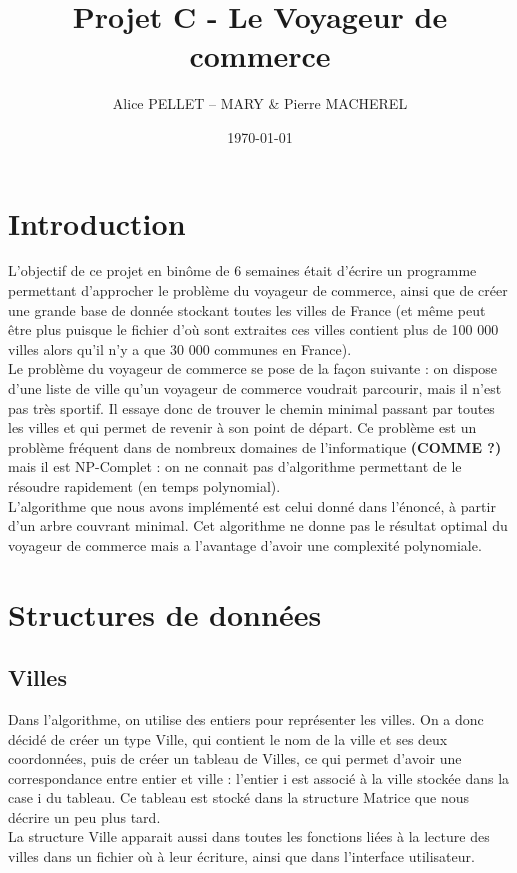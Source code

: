\documentclass[a4paper,11pt]{article}
\date{\today}
\title{Projet C - Le Voyageur de commerce}
\author{Alice PELLET -- MARY \& Pierre MACHEREL}
\begin{document}
\maketitle
\tableofcontents

\section*{Introduction} %

L'objectif de ce projet en binôme de 6 semaines était d'écrire un programme permettant d'approcher le problème du voyageur de commerce, ainsi que de créer une grande base de donnée stockant toutes les villes de France (et même peut être plus puisque le fichier d'où sont extraites ces villes contient plus de 100 000 villes alors qu'il n'y a que 30 000 communes en France).\\
Le problème du voyageur de commerce se pose de la façon suivante : on dispose d'une liste de ville qu'un voyageur de commerce voudrait parcourir, mais il n'est pas très sportif. Il essaye donc de trouver le chemin minimal passant par toutes les villes et qui permet de revenir à son point de départ. Ce problème est un problème fréquent dans de nombreux domaines de l'informatique \textbf{{\Large (COMME ?)}} mais il est NP-Complet : on ne connait pas d'algorithme permettant de le résoudre rapidement (en temps polynomial).\\
L'algorithme que nous avons implémenté est celui donné dans l'énoncé, à partir d'un arbre couvrant minimal. Cet algorithme ne donne pas le résultat optimal du voyageur de commerce mais a l'avantage d'avoir une complexité polynomiale.\\

\section{Structures de données}


\subsection{Villes}

Dans l'algorithme, on utilise des entiers pour représenter les villes. On a donc décidé de créer un type Ville, qui contient le nom de la ville et ses deux coordonnées, puis de créer un tableau de Villes, ce qui permet d'avoir une correspondance entre entier et ville : l'entier i est associé à la ville stockée dans la case i du tableau. Ce tableau est stocké dans la structure Matrice que nous décrire un peu plus tard.\\
La structure Ville apparait aussi dans toutes les fonctions liées à la lecture des villes dans un fichier où à leur écriture, ainsi que dans l'interface utilisateur.\\
\end{document}
